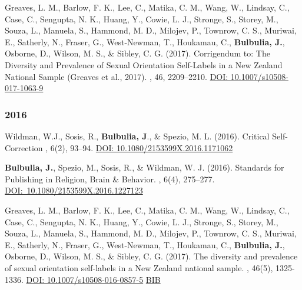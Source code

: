 \documentclass{article}
\begin{document}
\begin{thebibliography}{99}
Greaves, L. M., Barlow, F. K., Lee, C., Matika, C. M., Wang, W., Lindsay, C., Case, C., Sengupta, N. K., Huang, Y., Cowie, L. J., Stronge, S., Storey, M., Souza,  L., Manuela, S., Hammond, M. D., Milojev, P., Townrow, C. S., Muriwai, E., Satherly, N., Fraser, G., West-Newman, T., Houkamau, C., {\bf Bulbulia, J.}, Osborne, D., Wilson, M. S., \& Sibley, C. G.  (2017). 
\newblock Corrigendum to: The Diversity and Prevalence of Sexual Orientation Self-Labels in a New Zealand National Sample (Greaves et al., 2017). 
, 46, 2209–2210.
\href{ https://doi.org/10.1007/s10508-017-1063-9}{DOI: 10.1007/s10508-017-1063-9}


\subsubsection*{2016} 




Wildman, W.J., Sosis, R., {\bf Bulbulia, J}., \& Spezio, M. L. (2016).
\newblock Critical Self-Correction
, 6(2), 93--94. 
\href{https://doi.org/10.1080/2153599X.2016.1171062}{DOI: 10.1080/2153599X.2016.1171062}


{\bf Bulbulia, J.}, Spezio, M., Sosis, R., \& Wildman, W. J.  (2016).
\newblock Standards for Publishing in Religion, Brain \& Behavior.
, 6(4), 275--277. 
\href{http://dx.doi.org/10.1080/2153599X.2016.1227123}{DOI:~10.1080/2153599X.2016.1227123 }


Greaves, L. M., Barlow, F. K., Lee, C., Matika, C. M., Wang, W., Lindsay, C., Case, C., Sengupta, N. K., Huang, Y., Cowie, L. J., Stronge, S., Storey, M., Souza, L., Manuela, S., Hammond, M. D., Milojev, P., Townrow, C. S., Muriwai, E.,  Satherly, N.,   Fraser, G., West-Newman, T., Houkamau, C., {\bf Bulbulia, J.},  Osborne, D., Wilson, M. S., \& Sibley, C. G. (2017). 			
\newblock The diversity and prevalence of sexual orientation self-labels in a New Zealand national sample.									
, 46(5), 1325-1336. 												 
\href{https://doi.org/10.1007/s10508-016-0857-5}{DOI: 10.1007/s10508-016-0857-5}
\href{https://www.dropbox.com/s/gj05gm54am7tos7/2016.sxorient.bib?dl=0}{BIB}



\end{thebibliography}
\end{document}
